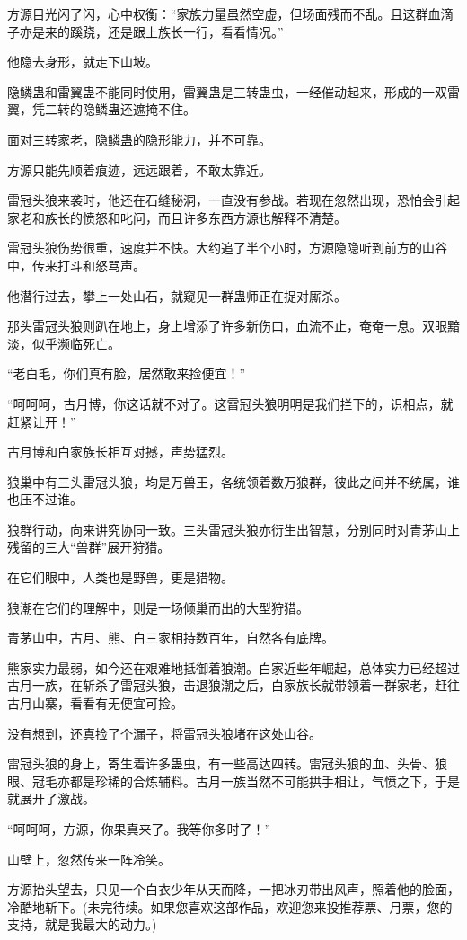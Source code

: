 \begin{this_body}
方源目光闪了闪，心中权衡：“家族力量虽然空虚，但场面残而不乱。且这群血滴子亦是来的蹊跷，还是跟上族长一行，看看情况。”

他隐去身形，就走下山坡。

隐鳞蛊和雷翼蛊不能同时使用，雷翼蛊是三转蛊虫，一经催动起来，形成的一双雷翼，凭二转的隐鳞蛊还遮掩不住。

面对三转家老，隐鳞蛊的隐形能力，并不可靠。

方源只能先顺着痕迹，远远跟着，不敢太靠近。

雷冠头狼来袭时，他还在石缝秘洞，一直没有参战。若现在忽然出现，恐怕会引起家老和族长的愤怒和叱问，而且许多东西方源也解释不清楚。

雷冠头狼伤势很重，速度并不快。大约追了半个小时，方源隐隐听到前方的山谷中，传来打斗和怒骂声。

他潜行过去，攀上一处山石，就窥见一群蛊师正在捉对厮杀。

那头雷冠头狼则趴在地上，身上增添了许多新伤口，血流不止，奄奄一息。双眼黯淡，似乎濒临死亡。

“老白毛，你们真有脸，居然敢来捡便宜！”

“呵呵呵，古月博，你这话就不对了。这雷冠头狼明明是我们拦下的，识相点，就赶紧让开！”

古月博和白家族长相互对撼，声势猛烈。

狼巢中有三头雷冠头狼，均是万兽王，各统领着数万狼群，彼此之间并不统属，谁也压不过谁。

狼群行动，向来讲究协同一致。三头雷冠头狼亦衍生出智慧，分别同时对青茅山上残留的三大“兽群”展开狩猎。

在它们眼中，人类也是野兽，更是猎物。

狼潮在它们的理解中，则是一场倾巢而出的大型狩猎。

青茅山中，古月、熊、白三家相持数百年，自然各有底牌。

熊家实力最弱，如今还在艰难地抵御着狼潮。白家近些年崛起，总体实力已经超过古月一族，在斩杀了雷冠头狼，击退狼潮之后，白家族长就带领着一群家老，赶往古月山寨，看看有无便宜可捡。

没有想到，还真捡了个漏子，将雷冠头狼堵在这处山谷。

雷冠头狼的身上，寄生着许多蛊虫，有一些高达四转。雷冠头狼的血、头骨、狼眼、冠毛亦都是珍稀的合炼辅料。古月一族当然不可能拱手相让，气愤之下，于是就展开了激战。

“呵呵呵，方源，你果真来了。我等你多时了！”

山壁上，忽然传来一阵冷笑。

方源抬头望去，只见一个白衣少年从天而降，一把冰刃带出风声，照着他的脸面，冷酷地斩下。(未完待续。如果您喜欢这部作品，欢迎您来投推荐票、月票，您的支持，就是我最大的动力。)

\end{this_body}

